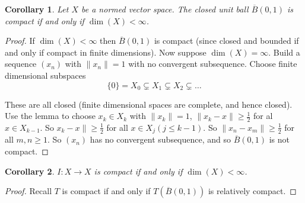 \documentclass[10pt, reqno, oneside]{amsart}
\theoremstyle{plain}%
\newtheorem*{cor}{Corollary}
\theoremstyle{definition}
\theoremstyle{remark}
\begin{document}
\begin{cor}
	Let $X$ be a normed vector space.  The closed unit ball $\overline B(0, 1)$ is compact if and only if $\dim(X) < \infty$.  
\end{cor}
\begin{proof}
	If $\dim(X) < \infty$ then $\overline B(0, 1)$ is compact (since closed and bounded if and only if compact in finite dimensions).  Now suppose $\dim(X) = \infty$.  Build a sequence $(x_n)$ with $\| x_n \| = 1$ with no convergent subsequence.  Choose finite dimensional subspaces \[
		\{ 0 \} = X_0 \subsetneq X_1 \subsetneq X_2 \subsetneq \dots
	\]  
	
	These are all closed (finite dimensional spaces are complete, and hence closed).  Use the lemma to choose $x_k \in X_k$ with $\| x_k \| = 1$, $\| x_k - x \| \geq \frac{1}{2}$ for al $ x \in X_{k-1}$.  So $x_k - x \| \geq \frac{1}{2}$ for all $x \in X_j (j \leq k - 1)$.  So $\| x_n - x_m \| \geq \frac{1}{2}$ for all $m , n \geq 1$.  So $(x_n)$ has no convergent subsequence, and so $\overline B(0, 1)$ is not compact.  
\end{proof}
\begin{cor}
	$I : X \rightarrow X$ is compact if and only if $\dim(X) < \infty$.  
\end{cor}
\begin{proof}
	Recall $T$ is compact if and only if $T(\overline B(0, 1))$ is relatively compact.	
\end{proof}
\end{document}
